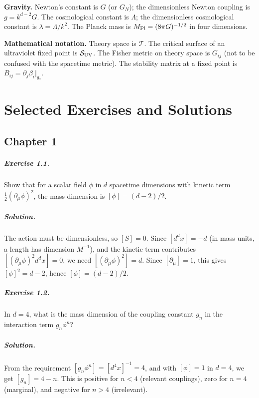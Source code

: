 \documentclass[11pt, twoside, openright]{book}
\theoremstyle{dotted}
\theoremstyle{definition}
\newcommand{\cT}{\mathcal{T}}          %
\newcommand{\cS}{\mathcal{S}}          %
\begin{document}
\medskip
\noindent\textbf{Gravity.}
Newton's constant is $G$ (or $G_N$); the dimensionless Newton coupling is
$g = k^{d-2}G$. The cosmological constant is $\Lambda$; the dimensionless
cosmological constant is $\lambda = \Lambda/k^2$. The Planck mass is $M_{\rm Pl}
= (8\pi G)^{-1/2}$ in four dimensions.

\medskip
\noindent\textbf{Mathematical notation.}
Theory space is $\cT$. The critical surface of an ultraviolet fixed point is $\cS_{\rm UV}$.
The Fisher metric on theory space is $G_{ij}$ (not to be confused with the spacetime
metric). The stability matrix at a fixed point is $B_{ij} = \partial_j\beta_i|_{g_*}$.

\chapter{Selected Exercises and Solutions}
\label{app:solutions}

\section*{Chapter 1}

\paragraph{Exercise 1.1.} Show that for a scalar field $\phi$ in $d$ spacetime
dimensions with kinetic term $\frac{1}{2}(\partial_\mu\phi)^2$, the mass dimension
is $[\phi] = (d-2)/2$.

\paragraph{Solution.} The action must be dimensionless, so $[S] = 0$. Since
$[d^dx] = -d$ (in mass units, a length has dimension $M^{-1}$), and the kinetic
term contributes $[(\partial_\mu\phi)^2d^dx] = 0$, we need
$[(\partial_\mu\phi)^2] = d$. Since $[\partial_\mu] = 1$, this gives
$[\phi]^2 = d - 2$, hence $[\phi] = (d-2)/2$.

\paragraph{Exercise 1.2.} In $d = 4$, what is the mass dimension of the coupling
constant $g_n$ in the interaction term $g_n\phi^n$?

\paragraph{Solution.} From the requirement $[g_n\phi^n] = [d^4x]^{-1} = 4$,
and with $[\phi] = 1$ in $d = 4$, we get $[g_n] = 4 - n$. This is positive for
$n < 4$ (relevant couplings), zero for $n = 4$ (marginal), and negative for $n > 4$
(irrelevant).
\end{document}
